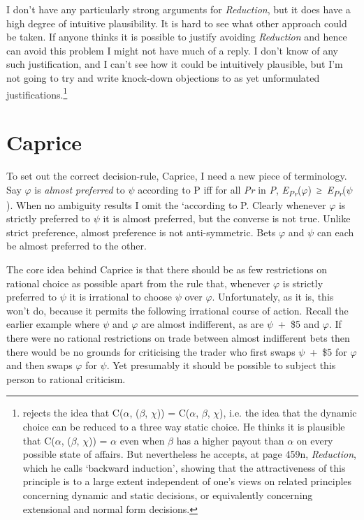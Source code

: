 I don't have any particularly strong arguments for \emph{Reduction}, but
it does have a high degree of intuitive plausibility. It is hard to see
what other approach could be taken. If anyone thinks it is possible to
justify avoiding \emph{Reduction} and hence can avoid this problem I
might not have much of a reply. I don't know of any such justification,
and I can't see how it could be intuitively plausible, but I'm not going
to try and write knock-down objections to as yet unformulated
justifications.\footnote{\citet{Seidenfeld1994} rejects the idea that
  C(\emph{$\alpha$}, (\emph{$\beta$}, $\chi$)) = C(\emph{$\alpha$}, $\beta$, $\chi$), i.e. the idea that the
  dynamic choice can be reduced to a three way static choice. He thinks
  it is plausible that C(\emph{$\alpha$}, (\emph{$\beta$}, $\chi$)) = $\alpha$ even when $\beta$ has a
  higher payout than $\alpha$ on every possible state of affairs. But
  nevertheless he accepts, at page 459n, \emph{Reduction}, which he
  calls `backward induction', showing that the attractiveness of this
  principle is to a large extent independent of one's views on related
  principles concerning dynamic and static decisions, or equivalently
  concerning extensional and normal form decisions.}

\hypertarget{caprice}{%
\section{Caprice}\label{caprice}}

To set out the correct decision-rule, Caprice, I need a new piece of
terminology. Say $\varphi$ is \emph{almost preferred} to $\psi$ according to P iff
for all \emph{Pr} in \emph{P},
\emph{E\textsubscript{Pr}}($\varphi$)~≥~\emph{E\textsubscript{Pr}}($\psi$). When no
ambiguity results I omit the `according to P. Clearly whenever $\varphi$ is
strictly preferred to $\psi$ it is almost preferred, but the converse is not
true. Unlike strict preference, almost preference is not anti-symmetric.
Bets $\varphi$ and $\psi$ can each be almost preferred to the other.

The core idea behind Caprice is that there should be as few restrictions
on rational choice as possible apart from the rule that, whenever $\varphi$ is
strictly preferred to $\psi$ it is irrational to choose $\psi$ over $\varphi$.
Unfortunately, as it is, this won't do, because it permits the following
irrational course of action. Recall the earlier example where $\psi$ and $\varphi$
are almost indifferent, as are $\psi$~+~\$5 and $\varphi$. If there were no rational
restrictions on trade between almost indifferent bets then there would
be no grounds for criticising the trader who first swaps $\psi$~+~\$5 for $\varphi$
and then swaps $\varphi$ for $\psi$. Yet presumably it should be possible to subject
this person to rational criticism.

